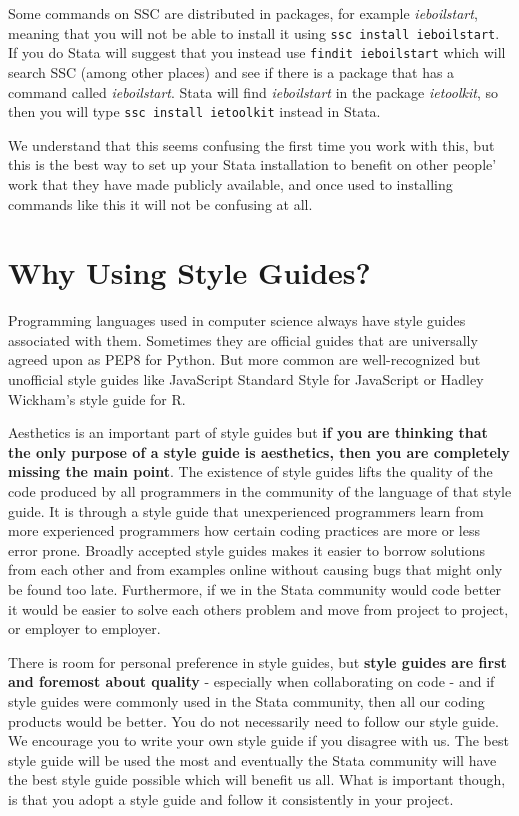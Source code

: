 Some commands on SSC are distributed in packages, for example \textit{ieboilstart}, meaning that you will 
not be able to install it using \verb+ssc install ieboilstart+. If you do Stata will suggest that you 
instead use \verb+findit ieboilstart+ which will search SSC (among other places) and see if there is a 
package that has a command called \textit{ieboilstart}. Stata will find \textit{ieboilstart} in the package 
\textit{ietoolkit}, so then you will type \verb+ssc install ietoolkit+ instead in Stata.

We understand that this seems confusing the first time you work with this, but this is the best way to set 
up your Stata installation to benefit on other people' work that they have made publicly available, and 
once used to installing commands like this it will not be confusing at all.

\section{Why Using Style Guides?}

Programming languages used in computer science always have style guides associated with them. Sometimes 
they are official guides that are universally agreed upon as PEP8 for 
Python. But more common are well-recognized but 
unofficial style guides like JavaScript Standard Style for 
JavaScript or Hadley Wickham's style guide for R.

Aesthetics is an important part of style guides but \textbf{if you are thinking that the only purpose of a 
style guide is aesthetics, then you are completely missing the main point}. The existence of style guides 
lifts the quality of the code produced by all programmers in the community of the language of that style 
guide. It is through a style guide that unexperienced programmers learn from more experienced programmers 
how certain coding practices are more or less error prone. Broadly accepted style guides makes it easier to 
borrow solutions from each other and from examples online without causing bugs that might only be found too 
late. Furthermore, if we in the Stata community would code better it would be easier to solve each others 
problem and move from project to project, or employer to employer.

There is room for personal preference in style guides, but \textbf{style guides are first and foremost 
about quality} - especially when collaborating on code - and if style guides were commonly used in the 
Stata community, then all our coding products would be better. You do not necessarily need to follow our 
style guide. We encourage you to write your own style guide if you disagree with us. The best style guide 
will be used the most and eventually the Stata community will have the best style guide possible which will 
benefit us all. What is important though, is that you adopt a style guide and follow it consistently in 
your project.


